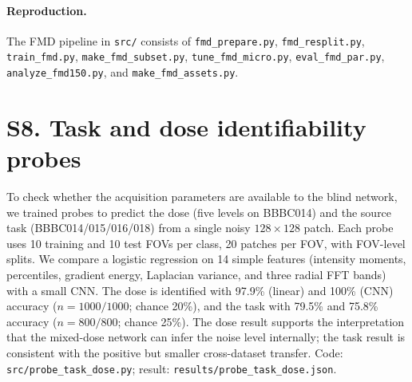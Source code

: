 \documentclass[11pt]{article}
\begin{document}
\paragraph{Reproduction.} The FMD pipeline in \texttt{src/} consists of
\texttt{fmd\_prepare.py}, \texttt{fmd\_resplit.py}, \texttt{train\_fmd.py},
\texttt{make\_fmd\_subset.py}, \texttt{tune\_fmd\_micro.py},
\texttt{eval\_fmd\_par.py}, \texttt{analyze\_fmd150.py}, and
\texttt{make\_fmd\_assets.py}.

\section*{S8. Task and dose identifiability probes}
To check whether the acquisition parameters are available to the blind network,
we trained probes to predict the dose (five levels on BBBC014) and the source
task (BBBC014/015/016/018) from a single noisy $128\times128$ patch. Each probe
uses 10 training and 10 test FOVs per class, 20 patches per FOV, with FOV-level
splits. We compare a logistic regression on 14 simple features (intensity
moments, percentiles, gradient energy, Laplacian variance, and three radial FFT
bands) with a small CNN. The dose is identified with 97.9\% (linear) and 100\%
(CNN) accuracy ($n=1000/1000$; chance 20\%), and the task with 79.5\% and
75.8\% accuracy ($n=800/800$; chance 25\%). The dose result supports the
interpretation that the mixed-dose network can infer the noise level
internally; the task result is consistent with the positive but smaller
cross-dataset transfer. Code: \texttt{src/probe\_task\_dose.py}; result:
\texttt{results/probe\_task\_dose.json}.



\end{document}
